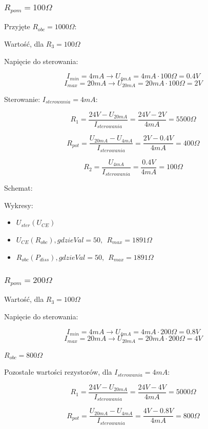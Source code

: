 \documentclass{article}
\begin{document}
\newpage
\subsubsection{$R_{pom} = 100 \Omega$}


Przyjęte $R_{obc} = 1000 \Omega$:


Wartość, dla $R_{3} = 100 \Omega$

Napięcie do sterowania:

$$
I_{min} = 4mA \rightarrow U_{4mA} = 4mA \cdot 100 \Omega = 0.4V
$$
$$
I_{max} = 20mA \rightarrow U_{20mA} = 20mA \cdot 100 \Omega = 2V
$$

Sterowanie: $I_{sterowania} = 4mA$:

$$
    R_{1} = \frac{24V - U_{20mA}}{I_{sterowania}}=\frac{24V - 2V}{4mA} = 5500 \Omega
$$

$$
    R_{pot} = \frac{U_{20mA} - U_{4mA}}{I_{sterowania}} = 
    \frac{2V-0.4V}{4mA} = 400 \Omega
$$


$$
    R_{2} = \frac{U_{4mA}}{I_{sterowania}} = \frac{0.4V}{4mA} = 100 \Omega
$$

Schemat:

Wykresy:

\begin{itemize}
    \item $U_{ster}(U_{CE})$
    \item $U_{CE}(R_{obc}), gdzie Val = 50, \ \ R_{max} = 1891 \Omega$
    \item $R_{obc}(P_{diss}), gdzie Val = 50, \ \ R_{max} =1891 \Omega$
\end{itemize}


\newpage
\subsubsection{$R_{pom} = 200 \Omega$}

Wartość, dla $R_{3} = 100 \Omega$

Napięcie do sterowania:

$$
    I_{min} = 4mA \rightarrow U_{4mA} = 4mA \cdot 200 \Omega = 0.8V
$$
$$
    I_{max} = 20mA \rightarrow U_{20mA} = 20mA \cdot 200 \Omega = 4V
$$



$R_{obc} = 800 \Omega$

Pozostałe wartości rezystorów, dla $I_{sterowania} = 4mA$:


$$
    R_{1} = \frac{24V - U_{20mA}}{I_{sterowania}}=\frac{24V - 4V}{4mA} = 5000 \Omega
$$

$$
    R_{pot} = \frac{U_{20mA} - U_{4mA}}{I_{sterowania}} = 
    \frac{4V-0.8V}{4mA} = 800 \Omega
$$
\end{document}

